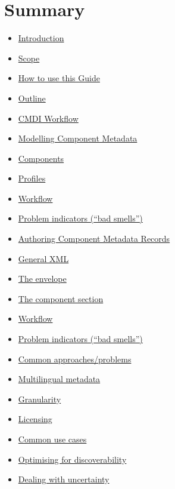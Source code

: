 \section{Summary}\label{summary}

\begin{itemize}
\tightlist
\item
  \href{README.md}{Introduction}
\item
  \href{introduction/scope.md}{Scope}
\item
  \href{how-to-use-this-guide.md}{How to use this Guide}
\item
  \href{introduction/outline.md}{Outline}
\item
  \href{cmdi_workflow.md}{CMDI Workflow}
\item
  \href{modelling_component_metadata/README.md}{Modelling Component
  Metadata}
\item
  \href{modelling_component_metadata/components.md}{Components}
\item
  \href{modelling_component_metadata/profiles.md}{Profiles}
\item
  \href{modelling_component_metadata/workflow.md}{Workflow}
\item
  \href{modelling_component_metadata/problem_indicators_bad_smells.md}{Problem
  indicators (``bad smells'')}
\item
  \href{authoring_component_metadata_records/README.md}{Authoring
  Component Metadata Records}
\item
  \href{authoring_component_metadata_records/general_xml.md}{General
  XML}
\item
  \href{authoring_component_metadata_records/the_envelope.md}{The
  envelope}
\item
  \href{authoring_component_metadata_records/the_component_section.md}{The
  component section}
\item
  \href{authoring_component_metadata_records/workflow.md}{Workflow}
\item
  \href{authoring_component_metadata_records/problem_indicators_bad_smells.md}{Problem
  indicators (``bad smells'')}
\item
  \href{common_approachesproblems/README.md}{Common approaches/problems}
\item
  \href{common_approachesproblems/multilingual_metadata.md}{Multilingual
  metadata}
\item
  \href{common_approachesproblems/granularity.md}{Granularity}
\item
  \href{common_approachesproblems/licensing.md}{Licensing}
\item
  \href{common_approachesproblems/common_use_cases.md}{Common use cases}
\item
  \href{optimising-for-discoverability.md}{Optimising for
  discoverability}
\item
  \href{common_approachesproblems/dealing-with-uncertainty.md}{Dealing
  with uncertainty}
\end{itemize}
